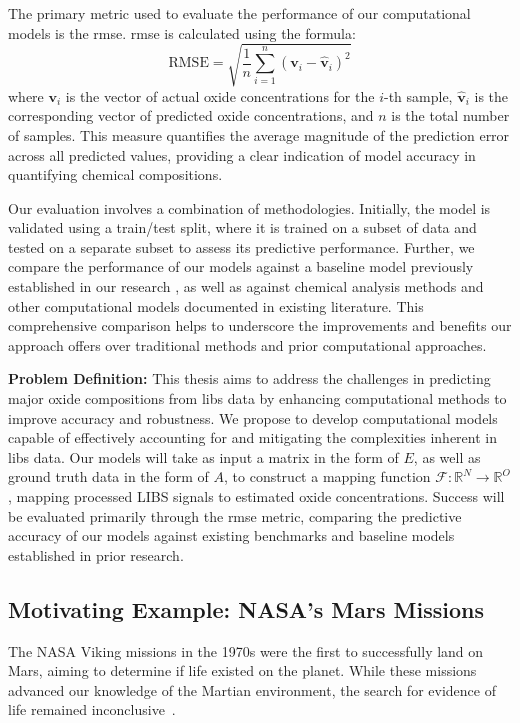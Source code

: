 The primary metric used to evaluate the performance of our computational models is the \gls{rmse}. \gls{rmse} is calculated using the formula:
\[
\text{RMSE} = \sqrt{\frac{1}{n} \sum_{i=1}^{n} (\mathbf{v}_i - \hat{\mathbf{v}}_i)^2}
\]
where \( \mathbf{v}_i \) is the vector of actual oxide concentrations for the \( i \)-th sample, \( \hat{\mathbf{v}}_i \) is the corresponding vector of predicted oxide concentrations, and \( n \) is the total number of samples. This measure quantifies the average magnitude of the prediction error across all predicted values, providing a clear indication of model accuracy in quantifying chemical compositions.

Our evaluation involves a combination of methodologies. Initially, the model is validated using a train/test split, where it is trained on a subset of data and tested on a separate subset to assess its predictive performance. Further, we compare the performance of our models against a baseline model previously established in our research \cite{p9_paper}, as well as against chemical analysis methods and other computational models documented in existing literature. This comprehensive comparison helps to underscore the improvements and benefits our approach offers over traditional methods and prior computational approaches.

\textbf{Problem Definition:} This thesis aims to address the challenges in predicting major oxide compositions from \gls{libs} data by enhancing computational methods to improve accuracy and robustness. We propose to develop computational models capable of effectively accounting for and mitigating the complexities inherent in \gls{libs} data. Our models will take as input a matrix in the form of $E$, as well as ground truth data in the form of $A$, to construct a mapping function $\mathcal{F} : \mathbb{R}^N \rightarrow \mathbb{R}^O$, mapping processed LIBS signals to estimated oxide concentrations. Success will be evaluated primarily through the \gls{rmse} metric, comparing the predictive accuracy of our models against existing benchmarks and baseline models established in prior research.


\subsection{Motivating Example: NASA's Mars Missions}
The NASA Viking missions in the 1970s were the first to successfully land on Mars, aiming to determine if life existed on the planet. 
While these missions advanced our knowledge of the Martian environment, the search for evidence of life remained inconclusive~\cite{marsnasagov_vikings}.


